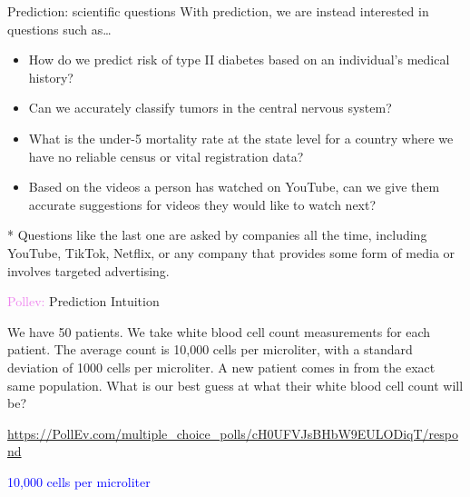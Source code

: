 \documentclass[10pt,t]{beamer}
\begin{document}
\begin{frame}{Prediction: scientific questions}
With prediction, we are instead interested in questions such as\dots

\vspace{0.3cm}

\begin{itemize}
	\item How do we predict risk of type II diabetes based on an individual's medical history?
	\medskip
	
	\item Can we accurately classify tumors in the central nervous system?
	
	\medskip
	
	\item What is the under-5 mortality rate at the state level for a country where we have no reliable census or vital registration data?
	\medskip
	
	\item Based on the videos a person has watched on YouTube, can we give them accurate suggestions for videos they would like to watch next?
\end{itemize}

\vspace{0.3cm}

* Questions like the last one are asked by companies all the time, including YouTube, TikTok, Netflix, or any company that provides some form of media or involves targeted advertising. 
\end{frame}




\begin{frame}{\textcolor{violet}{Pollev:} Prediction Intuition}
	
	We have 50 patients. We take white blood cell count measurements for each patient. The average count is 10,000 cells per microliter, with a standard deviation of 1000 cells per microliter. A new patient comes in from the exact same population. What is our best guess at what their white blood cell count will be?
	\smallskip
	
	\url{https://PollEv.com/multiple_choice_polls/cH0UFVJsBHbW9EULODiqT/respond}
	\pause
	
	\bigskip
	
	\textcolor{blue}{10,000 cells per microliter}
	
	
\end{frame}
\end{document}
